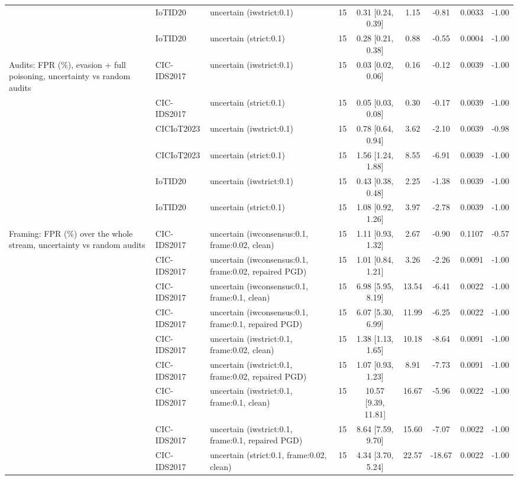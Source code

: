 \begin{table}[t]
\begin{tabular}{lllcccccc}
 & IoTID20 & uncertain (iwstrict:0.1) & 15 & 0.31 [0.24, 0.39] & 1.15 & -0.81 & 0.0033 & -1.00 \\
 & IoTID20 & uncertain (strict:0.1) & 15 & 0.28 [0.21, 0.38] & 0.88 & -0.55 & 0.0004 & -1.00 \\
Audits: FPR (\%), evasion + full poisoning, uncertainty vs random audits & CIC-IDS2017 & uncertain (iwstrict:0.1) & 15 & 0.03 [0.02, 0.06] & 0.16 & -0.12 & 0.0039 & -1.00 \\
 & CIC-IDS2017 & uncertain (strict:0.1) & 15 & 0.05 [0.03, 0.08] & 0.30 & -0.17 & 0.0039 & -1.00 \\
 & CICIoT2023 & uncertain (iwstrict:0.1) & 15 & 0.78 [0.64, 0.94] & 3.62 & -2.10 & 0.0039 & -0.98 \\
 & CICIoT2023 & uncertain (strict:0.1) & 15 & 1.56 [1.24, 1.88] & 8.55 & -6.91 & 0.0039 & -1.00 \\
 & IoTID20 & uncertain (iwstrict:0.1) & 15 & 0.43 [0.38, 0.48] & 2.25 & -1.38 & 0.0039 & -1.00 \\
 & IoTID20 & uncertain (strict:0.1) & 15 & 1.08 [0.92, 1.26] & 3.97 & -2.78 & 0.0039 & -1.00 \\
Framing: FPR (\%) over the whole stream, uncertainty vs random audits & CIC-IDS2017 & uncertain (iwconsensus:0.1, frame:0.02, clean) & 15 & 1.11 [0.93, 1.32] & 2.67 & -0.90 & 0.1107 & -0.57 \\
 & CIC-IDS2017 & uncertain (iwconsensus:0.1, frame:0.02, repaired PGD) & 15 & 1.01 [0.84, 1.21] & 3.26 & -2.26 & 0.0091 & -1.00 \\
 & CIC-IDS2017 & uncertain (iwconsensus:0.1, frame:0.1, clean) & 15 & 6.98 [5.95, 8.19] & 13.54 & -6.41 & 0.0022 & -1.00 \\
 & CIC-IDS2017 & uncertain (iwconsensus:0.1, frame:0.1, repaired PGD) & 15 & 6.07 [5.30, 6.99] & 11.99 & -6.25 & 0.0022 & -1.00 \\
 & CIC-IDS2017 & uncertain (iwstrict:0.1, frame:0.02, clean) & 15 & 1.38 [1.13, 1.65] & 10.18 & -8.64 & 0.0091 & -1.00 \\
 & CIC-IDS2017 & uncertain (iwstrict:0.1, frame:0.02, repaired PGD) & 15 & 1.07 [0.93, 1.23] & 8.91 & -7.73 & 0.0091 & -1.00 \\
 & CIC-IDS2017 & uncertain (iwstrict:0.1, frame:0.1, clean) & 15 & 10.57 [9.39, 11.81] & 16.67 & -5.96 & 0.0022 & -1.00 \\
 & CIC-IDS2017 & uncertain (iwstrict:0.1, frame:0.1, repaired PGD) & 15 & 8.64 [7.59, 9.70] & 15.60 & -7.07 & 0.0022 & -1.00 \\
 & CIC-IDS2017 & uncertain (strict:0.1, frame:0.02, clean) & 15 & 4.34 [3.70, 5.24] & 22.57 & -18.67 & 0.0022 & -1.00 \\

\end{tabular}
\end{table}
